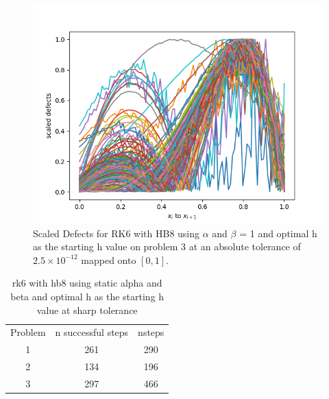 \begin{figure}[H]
\centering
\includegraphics[width=0.7\linewidth]{./figures/sharp_tolerance_rk6_with_hb8_p3_scaled_defects}
\caption{Scaled Defects for RK6 with HB8 using $\alpha$ and $\beta$ = 1 and optimal h as the starting h value on problem 3 at an absolute tolerance of $2.5 \times 10^{-12}$ mapped onto $[0, 1]$.}
\label{fig:sharp_tolerance_rk6_with_hb8_p3_scaled_defects}
\end{figure}

\begin{table}[h]
\caption {rk6 with hb8 using static alpha and beta and optimal h as the starting h value at sharp tolerance} \label{tab:rk6_with_hb8_sharp_tolerance}
\begin{center}
\begin{tabular}{ c c c } 
Problem & n successful steps      &       nsteps    \\ 
1       & 261                     &        290      \\ 
2       & 134                     &        196      \\
3       & 297                     &        466      \\
\end{tabular}
\end{center}
\end{table}	
